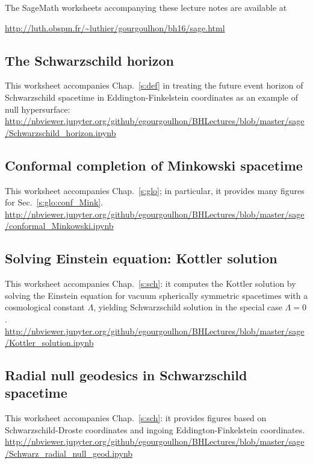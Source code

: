 The SageMath worksheets accompanying these lecture notes are available
at\\

\centerline{
\url{http://luth.obspm.fr/~luthier/gourgoulhon/bh16/sage.html}}

\subsection{The Schwarzschild horizon} \label{s:sam:Schwarz_hor}

This worksheet accompanies Chap.~\ref{s:def} in treating the future event horizon of
Schwarzschild spacetime in Eddington-Finkelstein coordinates as an example of null hypersurface:\\[1ex]
{\footnotesize
\url{http://nbviewer.jupyter.org/github/egourgoulhon/BHLectures/blob/master/sage/Schwarzschild_horizon.ipynb}
}

\subsection{Conformal completion of Minkowski spacetime}

This worksheet accompanies Chap.~\ref{s:glo}; in particular, it provides
many figures for Sec.~\ref{s:glo:conf_Mink}.\\[1ex]
{\footnotesize
\url{http://nbviewer.jupyter.org/github/egourgoulhon/BHLectures/blob/master/sage/conformal_Minkowski.ipynb}
}

\subsection{Solving Einstein equation: Kottler solution} \label{s:sam:Kottler_solution}


This worksheet accompanies Chap.~\ref{s:sch}: it computes the Kottler solution by solving the Einstein
equation for vacuum spherically symmetric spacetimes with a cosmological constant $\Lambda$,
yielding Schwarzschild solution in the special case $\Lambda=0$. \\[1ex]
{\footnotesize
\url{http://nbviewer.jupyter.org/github/egourgoulhon/BHLectures/blob/master/sage/Kottler_solution.ipynb}
}

\subsection{Radial null geodesics in Schwarzschild spacetime}

This worksheet accompanies Chap.~\ref{s:sch}: it provides figures based on
Schwarzschild-Droste coordinates and ingoing Eddington-Finkelstein coordinates.\\[1ex]
{\footnotesize
\url{http://nbviewer.jupyter.org/github/egourgoulhon/BHLectures/blob/master/sage/Schwarz_radial_null_geod.ipynb}
}

